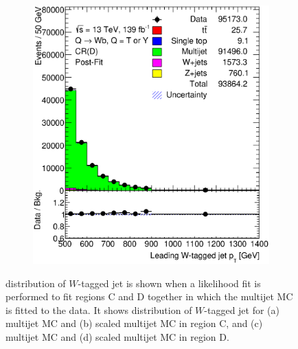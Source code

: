 \begin{figure}[hbt!]
\begin{subfigure}{.35\textwidth}
		\caption{}
	\end{subfigure}\hspace{0.6cm}
	\begin{subfigure}{.35\textwidth}
		\centering
		\includegraphics[width=\linewidth,height=\textheight,keepaspectratio]{CR_D_ljet_pt_postFit.eps}
		\caption{}
	\end{subfigure}
	\caption{\pt distribution of $W$-tagged jet is shown when a likelihood fit is performed to fit regions C and D together in which the multijet MC is fitted to the data. It shows \pt distribution of $W$-tagged jet for (a) multijet MC and (b) scaled multijet MC in region C, and (c) multijet MC and (d) scaled multijet MC in region D.}
	\label{fig:app:cd:ljetpt}
\end{figure}


